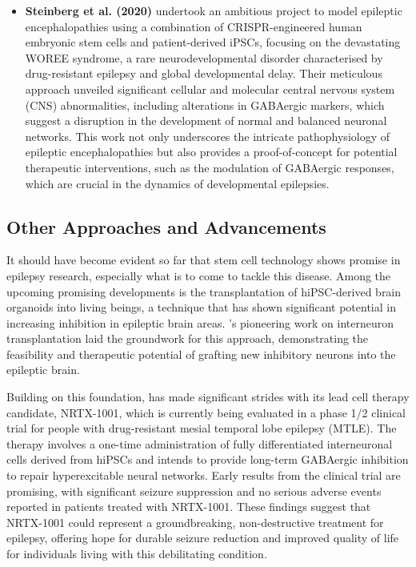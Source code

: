 \documentclass[10pt]{article}
\begin{document}
\begin{sloppypar}
\begin{itemize}[leftmargin=*]
    \item \textbf{Steinberg et al. (2020)} undertook an ambitious project to model epileptic encephalopathies using a combination of CRISPR-engineered human embryonic stem cells and patient-derived iPSCs, focusing on the devastating WOREE syndrome, a rare neurodevelopmental disorder characterised by drug-resistant epilepsy and global developmental delay. Their meticulous approach unveiled significant cellular and molecular central nervous system (CNS) abnormalities, including alterations in GABAergic markers, which suggest a disruption in the development of normal and balanced neuronal networks. This work not only underscores the intricate pathophysiology of epileptic encephalopathies but also provides a proof-of-concept for potential therapeutic interventions, such as the modulation of GABAergic responses, which are crucial in the dynamics of developmental epilepsies.
  \end{itemize}

  \subsection{Other Approaches and Advancements}
  \label{sec:other-approaches-and-advancements}

  It should have become evident so far that stem cell technology shows promise in epilepsy research, especially what is to come to tackle this disease. Among the upcoming promising developments is the transplantation of hiPSC-derived brain organoids into living beings, a technique that has shown significant potential in increasing inhibition in epileptic brain areas. \citeauthor{hunt_interneuron_2015} ’s \citeyearpar{hunt_interneuron_2015} pioneering work on interneuron transplantation laid the groundwork for this approach, demonstrating the feasibility and therapeutic potential of grafting new inhibitory neurons into the epileptic brain.

  Building on this foundation, \citeauthor{neurona_neurona_2022} \citeyearpar{neurona_neurona_2022} has made significant strides with its lead cell therapy candidate, NRTX-1001, which is currently being evaluated in a phase 1/2 clinical trial for people with drug-resistant mesial temporal lobe epilepsy (MTLE). The therapy involves a one-time administration of fully differentiated interneuronal cells derived from hiPSCs and intends to provide long-term GABAergic inhibition to repair hyperexcitable neural networks. Early results from the clinical trial are promising, with significant seizure suppression and no serious adverse events reported in patients treated with NRTX-1001. These findings suggest that NRTX-1001 could represent a groundbreaking, non-destructive treatment for epilepsy, offering hope for durable seizure reduction and improved quality of life for individuals living with this debilitating condition.


\end{sloppypar}
\end{document}
